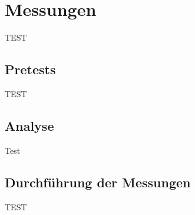 \chapter{Messungen}

TEST

\section{Pretests}
TEST
\section{Analyse}
Test
\section{Durchführung der Messungen}
TEST